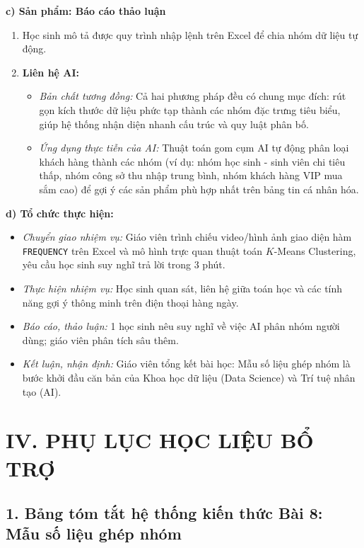 \documentclass[12pt, a4paper]{article}
\begin{document}
\noindent \textbf{c) Sản phẩm: Báo cáo thảo luận}
\begin{enumerate}[leftmargin=0.6cm]
    \item Học sinh mô tả được quy trình nhập lệnh trên Excel để chia nhóm dữ liệu tự động.
    \item \textbf{Liên hệ AI:}
    \begin{itemize}
        \item \textit{Bản chất tương đồng:} Cả hai phương pháp đều có chung mục đích: rút gọn kích thước dữ liệu phức tạp thành các nhóm đặc trưng tiêu biểu, giúp hệ thống nhận diện nhanh cấu trúc và quy luật phân bố.
        \item \textit{Ứng dụng thực tiễn của AI:} Thuật toán gom cụm AI tự động phân loại khách hàng thành các nhóm (ví dụ: nhóm học sinh - sinh viên chi tiêu thấp, nhóm công sở thu nhập trung bình, nhóm khách hàng VIP mua sắm cao) để gợi ý các sản phẩm phù hợp nhất trên bảng tin cá nhân hóa.
    \end{itemize}
\end{enumerate}

\noindent \textbf{d) Tổ chức thực hiện:}
\begin{itemize}[leftmargin=0.8cm]
    \item \textit{Chuyển giao nhiệm vụ:} Giáo viên trình chiếu video/hình ảnh giao diện hàm \texttt{FREQUENCY} trên Excel và mô hình trực quan thuật toán $K$-Means Clustering, yêu cầu học sinh suy nghĩ trả lời trong 3 phút.
    \item \textit{Thực hiện nhiệm vụ:} Học sinh quan sát, liên hệ giữa toán học và các tính năng gợi ý thông minh trên điện thoại hàng ngày.
    \item \textit{Báo cáo, thảo luận:} 1 học sinh nêu suy nghĩ về việc AI phân nhóm người dùng; giáo viên phân tích sâu thêm.
    \item \textit{Kết luận, nhận định:} Giáo viên tổng kết bài học: Mẫu số liệu ghép nhóm là bước khởi đầu căn bản của Khoa học dữ liệu (Data Science) và Trí tuệ nhân tạo (AI).
\end{itemize}

\section*{IV. PHỤ LỤC HỌC LIỆU BỔ TRỢ}

\subsection*{1. Bảng tóm tắt hệ thống kiến thức Bài 8: Mẫu số liệu ghép nhóm}
\end{document}
